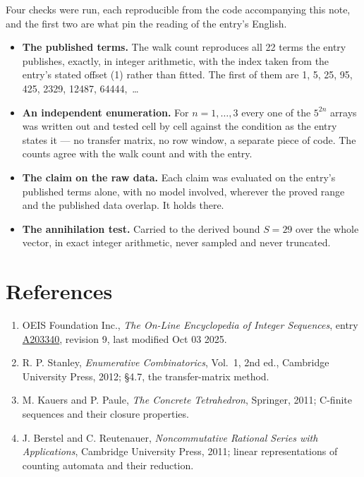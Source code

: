 \documentclass[11pt]{article}
\theoremstyle{definition}
\begin{document}
Four checks were run, each reproducible from the code accompanying this note, and the first two are what pin the reading of the entry's English.

\begin{itemize}

\item {\bfseries The published terms.} The walk count reproduces all 22 terms the entry publishes, exactly, in integer arithmetic, with the index taken from the entry's stated offset (1) rather than fitted. The first of them are 1, 5, 25, 95, 425, 2329, 12487, 64444,~\dots

\item {\bfseries An independent enumeration.} For $n = 1,\dots,3$ every one of the $5^{2n}$ arrays was written out and tested cell by cell against the condition as the entry states it --- no transfer matrix, no row window, a separate piece of code. The counts agree with the walk count and with the entry.

\item {\bfseries The claim on the raw data.} Each claim was evaluated on the entry's published terms alone, with no model involved, wherever the proved range and the published data overlap. It holds there.

\item {\bfseries The annihilation test.} Carried to the derived bound $S = 29$ over the whole vector, in exact integer arithmetic, never sampled and never truncated.

\end{itemize}

\section{References}

\begin{enumerate}

\item OEIS Foundation Inc., \emph{The On-Line Encyclopedia of Integer Sequences}, entry \href{https://oeis.org/A203340}{A203340}, revision 9, last modified Oct 03 2025.

\item R. P. Stanley, \emph{Enumerative Combinatorics}, Vol.~1, 2nd ed., Cambridge University Press, 2012; \S4.7, the transfer-matrix method.

\item M. Kauers and P. Paule, \emph{The Concrete Tetrahedron}, Springer, 2011; C-finite sequences and their closure properties.

\item J. Berstel and C. Reutenauer, \emph{Noncommutative Rational Series with Applications}, Cambridge University Press, 2011; linear representations of counting automata and their reduction.

\end{enumerate}
\end{document}
